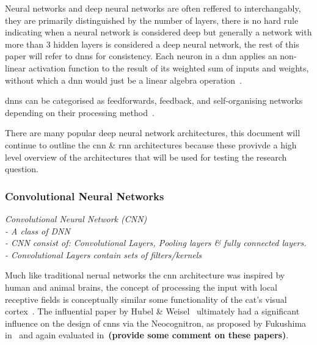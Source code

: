\documentclass[../../D1.tex]{subfiles}
\begin{document}
Neural networks and deep neural networks are often reffered to interchangably, they are primarily distinguished by the number of layers, there is no hard rule indicating when a neural network is considered deep but generally a network with more than 3 hidden layers is considered a deep neural network, the rest of this paper will refer to \acrshort{dnn}s for consistency. 
Each neuron in a \Acrshort{dnn} applies an non-linear activation function to the result of its weighted sum of inputs and weights, without which a \Acrshort{dnn} would just be a linear algebra operation~\autocite{szeEfficientProcessingDeep2017}.


\Acrshort{dnn}s can be categorised as feedforwards, feedback, and self-organising networks depending on their processing method~\autocite{chenDeepLearningMobile2020}.


There are many popular deep neural network architectures, this document will continue to outline the \Acrshort{cnn} \& \Acrshort{rnn} architectures because these provivde a high level overview of the architectures that will be used for testing the research question.



\subsubsection{Convolutional Neural Networks}

\emph{Convolutional Neural Network (CNN)\\
    - A class of DNN\\
    - CNN consist of: Convolutional Layers, Pooling layers \& fully connected layers.\\
    - Convolutional Layers contain sets of filters/kernels}


Much like traditional nerual networks the \Acrshort{cnn} architecture was inspired by human and animal brains, the concept of processing the input with local receptive fields is conceptually similar some functionality of the cat's visual cortex~\autocite{hubelReceptiveFieldsBinocular1962,lecunConvolutionalNetworksImages,pouyanfarSurveyDeepLearning2019}. 
The influential paper by Hubel \& Weisel~\autocite{hubelReceptiveFieldsBinocular1962} ultimately had a significant influence on the design of \Acrshort{cnn}s via the Neocognitron, as proposed by Fukushima in~\autocite{fukushimaNeocognitronSelforganizingNeural1980} and again evaluated in~\autocite{fukushimaNeocognitronHierarchicalNeural1988}\textbf{(provide some comment on these papers)}. 
\end{document}
